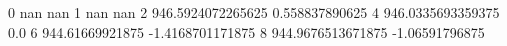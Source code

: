 0 nan nan
1 nan nan
2 946.5924072265625 0.558837890625
4 946.0335693359375 0.0
6 944.61669921875 -1.4168701171875
8 944.9676513671875 -1.06591796875
